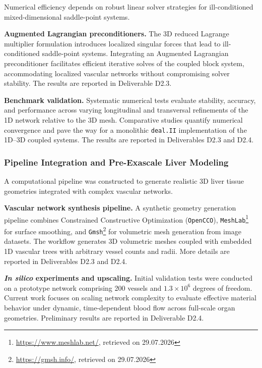 \documentclass[a4paper,12pt, numbers]{article}
\newcommand{\dealii}{\texttt{deal.II}}
\begin{document}
\noindent Numerical efficiency depends on robust linear solver strategies for ill-conditioned mixed-dimensional saddle-point systems.

\noindent\textbf{Augmented Lagrangian preconditioners.}
The 3D reduced Lagrange multiplier formulation introduces localized singular forces that lead to ill-conditioned saddle-point systems. Integrating an Augmented Lagrangian preconditioner facilitates efficient iterative solves of the coupled block system, accommodating localized vascular networks without compromising solver stability. The results are reported in Deliverable D2.3.

\noindent\textbf{Benchmark validation.}
Systematic numerical tests evaluate stability, accuracy, and performance across varying longitudinal and transversal refinements of the 1D network relative to the 3D mesh. Comparative studies quantify numerical convergence and pave the way for a monolithic \dealii{} implementation of the 1D--3D coupled systems.  The results are reported in Deliverables D2.3 and D2.4.

\subsubsection*{Pipeline Integration and Pre-Exascale Liver Modeling}

\noindent A computational pipeline was constructed to generate realistic 3D liver tissue geometries integrated with complex vascular networks.

\noindent\textbf{Vascular network synthesis pipeline.}
A synthetic geometry generation pipeline combines Constrained Constructive Optimization (\texttt{OpenCCO}), \texttt{MeshLab}\footnote{\url{https://www.meshlab.net/}, retrieved on 29.07.2026} for surface smoothing, and \texttt{Gmsh}\footnote{\url{https://gmsh.info/}, retrieved on 29.07.2026} for volumetric mesh generation from image datasets. The workflow generates 3D volumetric meshes coupled with embedded 1D vascular trees with arbitrary vessel counts and radii. More details are reported in Deliverables D2.3 and D2.4.

\noindent\textbf{\textit{In silico} experiments and upscaling.}
Initial validation tests were conducted on a prototype network comprising 200 vessels and $1.3 \times 10^6$ degrees of freedom. Current work focuses on scaling network complexity to evaluate effective material behavior under dynamic, time-dependent blood flow across full-scale organ geometries. Preliminary results are reported in Deliverable D2.4.
\end{document}
